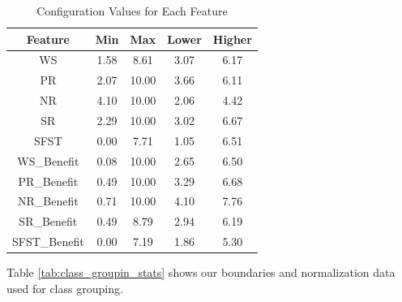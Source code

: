 \documentclass[12pt,letterpaper]{article}
\begin{document}
\begin{table}[H]
\centering
\begin{tabular}{|c|c|c|c|c|}
\hline
\textbf{Feature} & \textbf{Min} & \textbf{Max} & \textbf{Lower} & \textbf{Higher} \\
\hline
WS & 1.58 & 8.61 & 3.07 & 6.17 \\
\hline
PR & 2.07 & 10.00 & 3.66 & 6.11 \\
\hline
NR & 4.10 & 10.00 & 2.06 & 4.42 \\
\hline
SR & 2.29 & 10.00 & 3.02 & 6.67 \\
\hline
SFST & 0.00 & 7.71 & 1.05 & 6.51 \\
\hline
WS\_Benefit & 0.08 & 10.00 & 2.65 & 6.50 \\
\hline
PR\_Benefit & 0.49 & 10.00 & 3.29 & 6.68 \\
\hline
NR\_Benefit & 0.71 & 10.00 & 4.10 & 7.76 \\
\hline
SR\_Benefit & 0.49 & 8.79 & 2.94 & 6.19 \\
\hline
SFST\_Benefit & 0.00 & 7.19 & 1.86 & 5.30 \\
\hline
\end{tabular}
\caption{Configuration Values for Each Feature}
\label{config_values_table}
\end{table}


Table \ref{tab:class_groupin_stats} shows our boundaries and normalization data used for class grouping.
\end{document}
